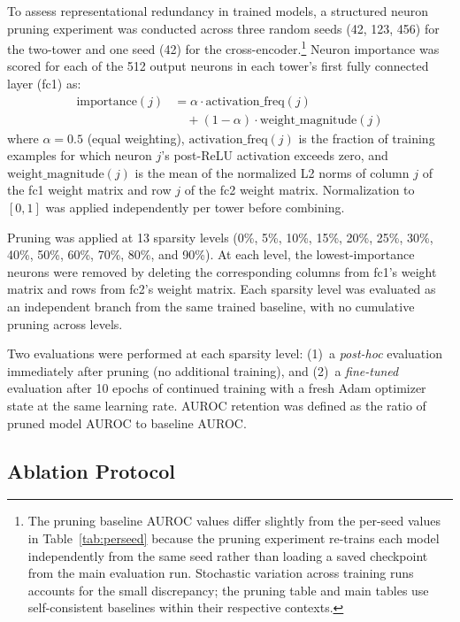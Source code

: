 \documentclass[journal]{IEEEtran}
\begin{document}
To assess representational redundancy in trained models, a structured neuron
pruning experiment was conducted across three random seeds (42, 123, 456) for
the two-tower and one seed (42) for the cross-encoder.\footnote{The pruning
baseline AUROC values differ slightly from the per-seed values in
Table~\ref{tab:perseed} because the pruning experiment re-trains each model
independently from the same seed rather than loading a saved checkpoint from
the main evaluation run. Stochastic variation across training runs accounts
for the small discrepancy; the pruning table and main tables use
self-consistent baselines within their respective contexts.}
Neuron importance was scored for each of the 512 output neurons
in each tower's first fully connected layer (fc1) as:
%
\begin{align}
  \text{importance}(j) &= \alpha \cdot \text{activation\_freq}(j) \nonumber \\
                       &\quad + (1 - \alpha) \cdot \text{weight\_magnitude}(j)
\end{align}
%
where $\alpha = 0.5$ (equal weighting), $\text{activation\_freq}(j)$ is the
fraction of training examples for which neuron $j$'s post-ReLU activation
exceeds zero, and $\text{weight\_magnitude}(j)$ is the mean of the normalized
L2 norms of column $j$ of the fc1 weight matrix and row $j$ of the fc2 weight
matrix. Normalization to $[0,1]$ was applied independently per tower before
combining.

Pruning was applied at 13 sparsity levels (0\%, 5\%, 10\%, 15\%, 20\%, 25\%,
30\%, 40\%, 50\%, 60\%, 70\%, 80\%, and 90\%). At each level, the
lowest-importance neurons were removed by deleting the corresponding columns
from fc1's weight matrix and rows from fc2's weight matrix. Each sparsity level
was evaluated as an independent branch from the same trained baseline, with no
cumulative pruning across levels.

Two evaluations were performed at each sparsity level: (1)~a \emph{post-hoc}
evaluation immediately after pruning (no additional training), and
(2)~a \emph{fine-tuned} evaluation after 10 epochs of continued training with
a fresh Adam optimizer state at the same learning rate. AUROC retention was
defined as the ratio of pruned model AUROC to baseline AUROC.

\subsection{Ablation Protocol}
\label{ssec:ablation_method}
\end{document}
